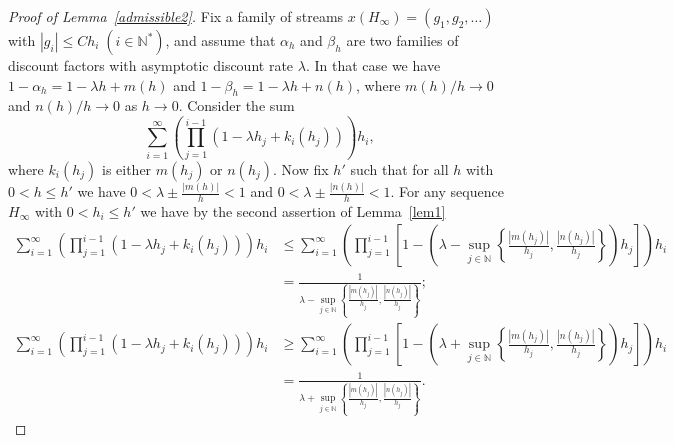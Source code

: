 \documentclass[english,openary,12pt]{article}
\theoremstyle{definition}
\newcommand{\N}{\mathbb{N}}
\begin{document}
\begin{proof}[Proof of Lemma~\ref{admissible2}]
Fix a family of streams $x (H_\infty) = (g_1, g_2, \ldots)$ with 
$|g_i| \le C h_i \; (i \in \N^*)$, and assume that $\alpha_h$ and $\beta_h$ 
are two families of discount factors with asymptotic discount rate $\lambda$. 
In that case we have $1 - \alpha_h = 1-\lambda h + m(h)$ and 
$1 - \beta_h = 1-\lambda h + n(h)$, where $m(h) / h \to 0$ and 
$n(h) / h \to 0$ as $h \to 0$. Consider the sum 
$$\sum\limits_{i = 1}^\infty \left(\prod\limits_{j = 1}^{i-1} 
(1 - \lambda h_j + k_i(h_j))\right) h_i,$$ where $k_i(h_j)$ is either 
$m(h_j)$ or $n(h_j)$. Now fix $h'$ such that for all $h$ with
$0 < h \le h'$ we have 
$\displaystyle{0 < \lambda \pm \frac{|m(h)|}{h} < 1}$ and 
$\displaystyle{0 < \lambda \pm \frac{|n(h)|}{h} < 1}$. For any sequence 
$H_\infty$ with $0 < h_i \le h'$ we have by the second assertion of 
Lemma~\ref{lem1}
\begin{align*}
\sum\limits_{i = 1}^\infty \left(\prod\limits_{j = 1}^{i-1} 
(1 - \lambda h_j + k_i(h_j))\right) h_i &\le
\sum\limits_{i = 1}^\infty \left(\prod\limits_{j = 1}^{i-1} 
\left[1-\left(\lambda -\sup\limits_{j\in\N} \left\{\frac{|m(h_j)|}{h_j}, 
\frac{|n(h_j)|}{h_j}\right\} \right) h_j\right]\right) h_i \\
&= \frac{1}{\lambda -\sup\limits_{j\in\N}
\left\{\frac{|m(h_j)|}{h_j},\frac{|n(h_j)|}{h_j}\right\}}; \\
\sum\limits_{i = 1}^\infty \left(\prod\limits_{j = 1}^{i-1} 
(1 - \lambda h_j + k_i(h_j))\right) h_i &\ge
\sum\limits_{i = 1}^\infty \left(\prod\limits_{j = 1}^{i-1} 
\left[1-\left(\lambda + \sup\limits_{j\in\N} \left\{\frac{|m(h_j)|}{h_j}, 
\frac{|n(h_j)|}{h_j}\right\} \right) h_j\right]\right) h_i \\
&= \frac{1}{\lambda + \sup\limits_{j\in\N}
\left\{\frac{|m(h_j)|}{h_j},\frac{|n(h_j)|}{h_j}\right\}}.
\end{align*}


\end{proof}
\end{document}
